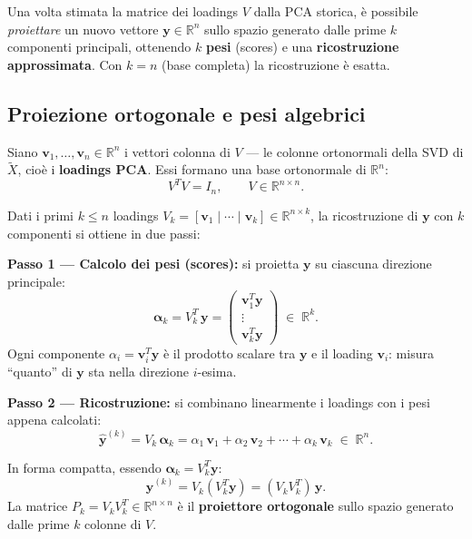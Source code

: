\documentclass[11pt,a4paper]{article}
\theoremstyle{plain}
\theoremstyle{definition}
\theoremstyle{remark}
\begin{document}
Una volta stimata la matrice dei loadings $V$ dalla PCA storica, è possibile
\emph{proiettare} un nuovo vettore $\mathbf{y} \in \mathbb{R}^n$ sullo spazio
generato dalle prime $k$ componenti principali, ottenendo $k$ \textbf{pesi}
(scores) e una \textbf{ricostruzione approssimata}. Con $k = n$ (base completa)
la ricostruzione è esatta.



\subsection{Proiezione ortogonale e pesi algebrici}

Siano $\mathbf{v}_1, \ldots, \mathbf{v}_n \in \mathbb{R}^n$ i vettori colonna
di $V$ --- le colonne ortonormali della SVD di $\tilde{X}$, cioè i
\textbf{loadings PCA}. Essi formano una base ortonormale di $\mathbb{R}^n$:
\[
  V^T V = I_n, \qquad V \in \mathbb{R}^{n \times n}.
\]

Dati i primi $k \leq n$ loadings $V_k = [\mathbf{v}_1 \mid \cdots \mid \mathbf{v}_k]
\in \mathbb{R}^{n \times k}$, la ricostruzione di $\mathbf{y}$ con $k$
componenti si ottiene in due passi:


\textbf{Passo 1 --- Calcolo dei pesi (scores):} si proietta $\mathbf{y}$
su ciascuna direzione principale:
\[
  \boldsymbol{\alpha}_k = V_k^T\,\mathbf{y}
  = \begin{pmatrix} \mathbf{v}_1^T \mathbf{y} \\ \vdots \\ \mathbf{v}_k^T \mathbf{y} \end{pmatrix}
  \;\in\; \mathbb{R}^k.
\]
Ogni componente $\alpha_i = \mathbf{v}_i^T \mathbf{y}$ è il prodotto scalare
tra $\mathbf{y}$ e il loading $\mathbf{v}_i$: misura ``quanto'' di $\mathbf{y}$
sta nella direzione $i$-esima.

\medskip
\textbf{Passo 2 --- Ricostruzione:} si combinano linearmente i loadings
con i pesi appena calcolati:
\[
  \hat{\mathbf{y}}^{(k)} = V_k\,\boldsymbol{\alpha}_k
  = \alpha_1\,\mathbf{v}_1 + \alpha_2\,\mathbf{v}_2 + \cdots + \alpha_k\,\mathbf{v}_k
  \;\in\; \mathbb{R}^n.
\]


In forma compatta, essendo $\boldsymbol{\alpha}_k = V_k^T \mathbf{y}$:
\[
  \hat{\mathbf{y}}^{(k)} = V_k (V_k^T \mathbf{y}) = (V_k V_k^T)\,\mathbf{y}.
\]
La matrice $P_k = V_k V_k^T \in \mathbb{R}^{n \times n}$ è il \textbf{proiettore
ortogonale} sullo spazio generato dalle prime $k$ colonne di $V$.
\end{document}
